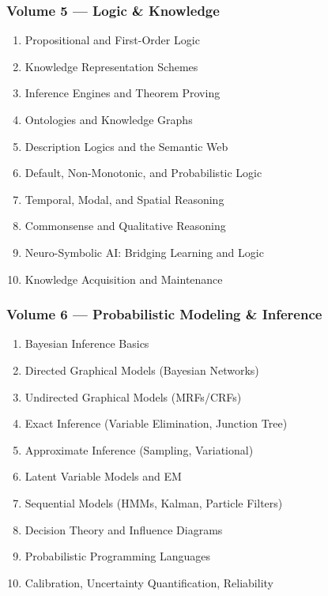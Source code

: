 \documentclass[
  letterpaper,
  DIV=11,
  numbers=noendperiod]{scrreprt}
\providecommand{\tightlist}{%
  \setlength{\itemsep}{0pt}\setlength{\parskip}{0pt}}
\begin{document}
\subsubsection{Volume 5 --- Logic \&
Knowledge}\label{volume-5-logic-knowledge}

\begin{enumerate}
\def\labelenumi{\arabic{enumi}.}
\setcounter{enumi}{40}
\tightlist
\item
  Propositional and First-Order Logic
\item
  Knowledge Representation Schemes
\item
  Inference Engines and Theorem Proving
\item
  Ontologies and Knowledge Graphs
\item
  Description Logics and the Semantic Web
\item
  Default, Non-Monotonic, and Probabilistic Logic
\item
  Temporal, Modal, and Spatial Reasoning
\item
  Commonsense and Qualitative Reasoning
\item
  Neuro-Symbolic AI: Bridging Learning and Logic
\item
  Knowledge Acquisition and Maintenance
\end{enumerate}

\subsubsection{Volume 6 --- Probabilistic Modeling \&
Inference}\label{volume-6-probabilistic-modeling-inference}

\begin{enumerate}
\def\labelenumi{\arabic{enumi}.}
\setcounter{enumi}{50}
\tightlist
\item
  Bayesian Inference Basics
\item
  Directed Graphical Models (Bayesian Networks)
\item
  Undirected Graphical Models (MRFs/CRFs)
\item
  Exact Inference (Variable Elimination, Junction Tree)
\item
  Approximate Inference (Sampling, Variational)
\item
  Latent Variable Models and EM
\item
  Sequential Models (HMMs, Kalman, Particle Filters)
\item
  Decision Theory and Influence Diagrams
\item
  Probabilistic Programming Languages
\item
  Calibration, Uncertainty Quantification, Reliability
\end{enumerate}
\end{document}
